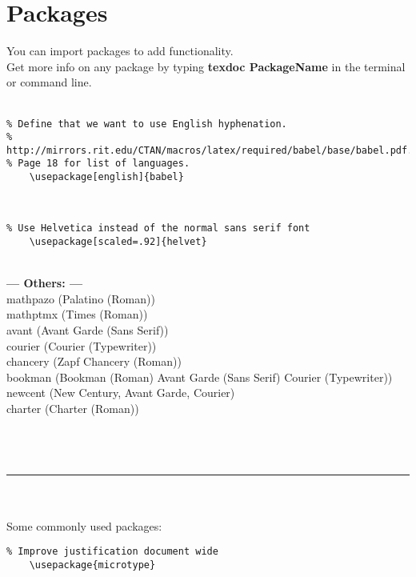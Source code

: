 \documentclass[a4paper,12pt,titlepage]{article}
\begin{document}
\section{Packages}
You can import packages to add functionality.
\\Get more info on any package by typing \textbf{texdoc PackageName} in the terminal or command line.
\\
\\
\begin{lstlisting}
% Define that we want to use English hyphenation.
% http://mirrors.rit.edu/CTAN/macros/latex/required/babel/base/babel.pdf.
% Page 18 for list of languages.
	\usepackage[english]{babel}
\end{lstlisting}
~\\
\begin{lstlisting}
% Use Helvetica instead of the normal sans serif font
	\usepackage[scaled=.92]{helvet}
\end{lstlisting}
~\\
\hspace*{10mm}\textbf{--- Others: ---}
\\\hspace*{14mm}mathpazo (Palatino (Roman))
\\\hspace*{14mm}mathptmx (Times (Roman))
\\\hspace*{14mm}avant (Avant Garde (Sans Serif))
\\\hspace*{14mm}courier (Courier (Typewriter))
\\\hspace*{14mm}chancery (Zapf Chancery (Roman))
\\\hspace*{14mm}bookman (Bookman (Roman) Avant Garde (Sans Serif) Courier (Typewriter))
\\\hspace*{14mm}newcent (New Century, Avant Garde, Courier)
\\\hspace*{14mm}charter (Charter (Roman))
\\
\\
\\
\\
\rule{\linewidth}{0.1mm}
\\
\\Some commonly used packages:
\\
\begin{lstlisting}
% Improve justification document wide
	\usepackage{microtype}
\end{lstlisting}
\end{document}

